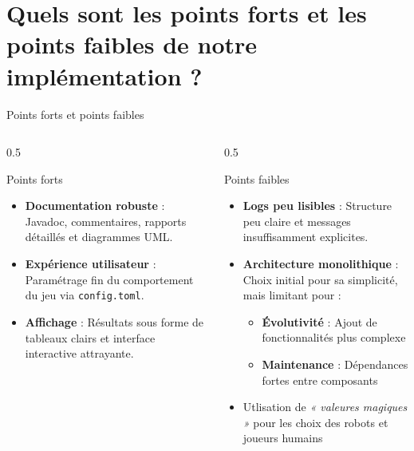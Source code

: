 \documentclass[10pt,french]{beamer}
\begin{document}
\section{Quels sont les points forts et les points faibles de notre implémentation ?}

\begin{frame}{Points forts et points faibles}
    \begin{columns}
        \begin{column}{0.5\textwidth}
            \begin{exampleblock}{Points forts}
                \begin{itemize}
                    \item \textbf{Documentation robuste} : Javadoc, commentaires, rapports détaillés et diagrammes UML.
                    \item \textbf{Expérience utilisateur} : Paramétrage fin du comportement du jeu via \texttt{config.toml}.
                    \item \textbf{Affichage} : Résultats sous forme de tableaux clairs et interface interactive attrayante.
                \end{itemize}
            \end{exampleblock}
        \end{column}

        \begin{column}{0.5\textwidth}
            \begin{alertblock}{Points faibles}
                \begin{itemize}
                    \item \textbf{Logs peu lisibles} : Structure peu claire et messages insuffisamment explicites.
  \item \textbf{Architecture monolithique} : Choix initial pour sa simplicité, mais limitant pour :
        \begin{itemize}
            \scriptsize
            \item[•] \textbf{Évolutivité} : Ajout de fonctionnalités plus complexe
            \item[•] \textbf{Maintenance} : Dépendances fortes entre composants
        \end{itemize}
            \item Utlisation de \textit{« valeures magiques »} pour les choix des robots et joueurs humains
                \end{itemize}
            \end{alertblock}
        \end{column}
    \end{columns}
\end{frame}
\end{document}
